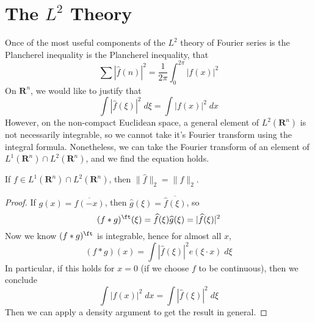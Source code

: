 \section{The $L^2$ Theory}

Once of the most useful components of the $L^2$ theory of Fourier series is the Plancherel inequality is the Plancherel inequality, that
%
\[ \sum |\widehat{f}(n)|^2 = \frac{1}{2\pi} \int_0^{2\pi} |f(x)|^2 \]
%
On $\mathbf{R}^n$, we would like to justify that
%
\[ \int |\widehat{f}(\xi)|^2\; d\xi = \int |f(x)|^2\; dx \]
%
However, on the non-compact Euclidean space, a general element of $L^2(\mathbf{R}^n)$ is not necessarily integrable, so we cannot take it's Fourier transform using the integral formula. Nonetheless, we can take the Fourier transform of an element of $L^1(\mathbf{R}^n) \cap L^2(\mathbf{R}^n)$, and we find the equation holds.

\begin{theorem}
	If $f \in L^1(\mathbf{R}^n) \cap L^2(\mathbf{R}^n)$, then $\| \widehat{f} \|_2 = \| f \|_2$.
\end{theorem}
\begin{proof}
	If $g(x) = \overline{f(-x)}$, then $\widehat{g}(\xi) = \overline{\widehat{f}(\xi)}$, so
	\[ (f * g)^\ft(\xi) = \widehat{f}(\xi) \widehat{g}(\xi) = |\widehat{f}(\xi)|^2 \]
	Now we know $(f * g)^\ft$ is integrable, hence for almost all $x$,
	\[ (f * g)(x) = \int |\widehat{f}(\xi)|^2 e(\xi \cdot x)\; d\xi \]
	In particular, if this holds for $x = 0$ (if we choose $f$ to be continuous), then we conclude
	\[ \int |f(x)|^2\; dx = \int |\widehat{f}(\xi)|^2\; d\xi \]
	Then we can apply a density argument to get the result in general.
\end{proof}

